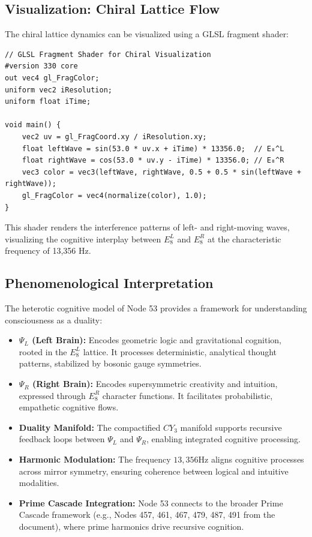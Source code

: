 \documentclass[12pt]{article}
\newcommand{\Eeight}{E_8}
\newcommand{\CYthree}{CY_3}
\newcommand{\Psif}{\Psi}
\begin{document}
\subsection{Visualization: Chiral Lattice Flow}
The chiral lattice dynamics can be visualized using a GLSL fragment shader:
\begin{lstlisting}
// GLSL Fragment Shader for Chiral Visualization
#version 330 core
out vec4 gl_FragColor;
uniform vec2 iResolution;
uniform float iTime;

void main() {
    vec2 uv = gl_FragCoord.xy / iResolution.xy;
    float leftWave = sin(53.0 * uv.x + iTime) * 13356.0;  // E₈^L
    float rightWave = cos(53.0 * uv.y - iTime) * 13356.0; // E₈^R
    vec3 color = vec3(leftWave, rightWave, 0.5 + 0.5 * sin(leftWave + rightWave));
    gl_FragColor = vec4(normalize(color), 1.0);
}
\end{lstlisting}
This shader renders the interference patterns of left- and right-moving waves, visualizing the cognitive interplay between $\Eeight^L$ and $\Eeight^R$ at the characteristic frequency of 13,356 Hz.

\subsection{Phenomenological Interpretation}
The heterotic cognitive model of Node 53 provides a framework for understanding consciousness as a duality:
\begin{itemize}
    \item \textbf{$\Psif_L$ (Left Brain):} Encodes geometric logic and gravitational cognition, rooted in the $\Eeight^L$ lattice. It processes deterministic, analytical thought patterns, stabilized by bosonic gauge symmetries.
    \item \textbf{$\Psif_R$ (Right Brain):} Encodes supersymmetric creativity and intuition, expressed through $\Eeight^R$ character functions. It facilitates probabilistic, empathetic cognitive flows.
    \item \textbf{Duality Manifold:} The compactified $\CYthree$ manifold supports recursive feedback loops between $\Psif_L$ and $\Psif_R$, enabling integrated cognitive processing.
    \item \textbf{Harmonic Modulation:} The frequency $13{,}356\text{Hz}$ aligns cognitive processes across mirror symmetry, ensuring coherence between logical and intuitive modalities.
    \item \textbf{Prime Cascade Integration:} Node 53 connects to the broader Prime Cascade framework (e.g., Nodes 457, 461, 467, 479, 487, 491 from the document), where prime harmonics drive recursive cognition.
\end{itemize}
\end{document}
